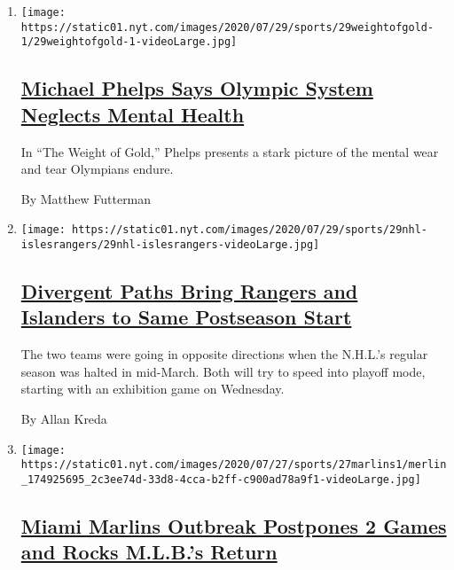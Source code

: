 \begin{enumerate}
\def\labelenumi{\arabic{enumi}.}
\item
  \texttt{[image: https://static01.nyt.com/images/2020/07/29/sports/29weightofgold-1/29weightofgold-1-videoLarge.jpg]}

  \hypertarget{michael-phelps-says-olympic-system-neglects-mental-health}{%
  \subsection{\texorpdfstring{\href{/2020/07/29/sports/olympics/michael-phelps-documentary-weight-of-gold.html}{Michael
  Phelps Says Olympic System Neglects Mental
  Health}}{Michael Phelps Says Olympic System Neglects Mental Health}}\label{michael-phelps-says-olympic-system-neglects-mental-health}}

  In ``The Weight of Gold,'' Phelps presents a stark picture of the
  mental wear and tear Olympians endure.

  By Matthew Futterman
\item
  \texttt{[image: https://static01.nyt.com/images/2020/07/29/sports/29nhl-islesrangers/29nhl-islesrangers-videoLarge.jpg]}

  \hypertarget{divergent-paths-bring-rangers-and-islanders-to-same-postseason-start}{%
  \subsection{\texorpdfstring{\href{/2020/07/29/sports/hockey/new-york-rangers-islanders-playoffs.html}{Divergent
  Paths Bring Rangers and Islanders to Same Postseason
  Start}}{Divergent Paths Bring Rangers and Islanders to Same Postseason Start}}\label{divergent-paths-bring-rangers-and-islanders-to-same-postseason-start}}

  The two teams were going in opposite directions when the N.H.L.'s
  regular season was halted in mid-March. Both will try to speed into
  playoff mode, starting with an exhibition game on Wednesday.

  By Allan Kreda
\item
  \texttt{[image: https://static01.nyt.com/images/2020/07/27/sports/27marlins1/merlin\_174925695\_2c3ee74d-33d8-4cca-b2ff-c900ad78a9f1-videoLarge.jpg]}

  \hypertarget{miami-marlins-outbreak-postpones-2-games-and-rocks-mlbs-return}{%
  \subsection{\texorpdfstring{\href{/2020/07/27/sports/baseball/marlins-game-canceled.html}{Miami
  Marlins Outbreak Postpones 2 Games and Rocks M.L.B.'s
  Return}}{Miami Marlins Outbreak Postpones 2 Games and Rocks M.L.B.'s Return}}\label{miami-marlins-outbreak-postpones-2-games-and-rocks-mlbs-return}}


\end{enumerate}
